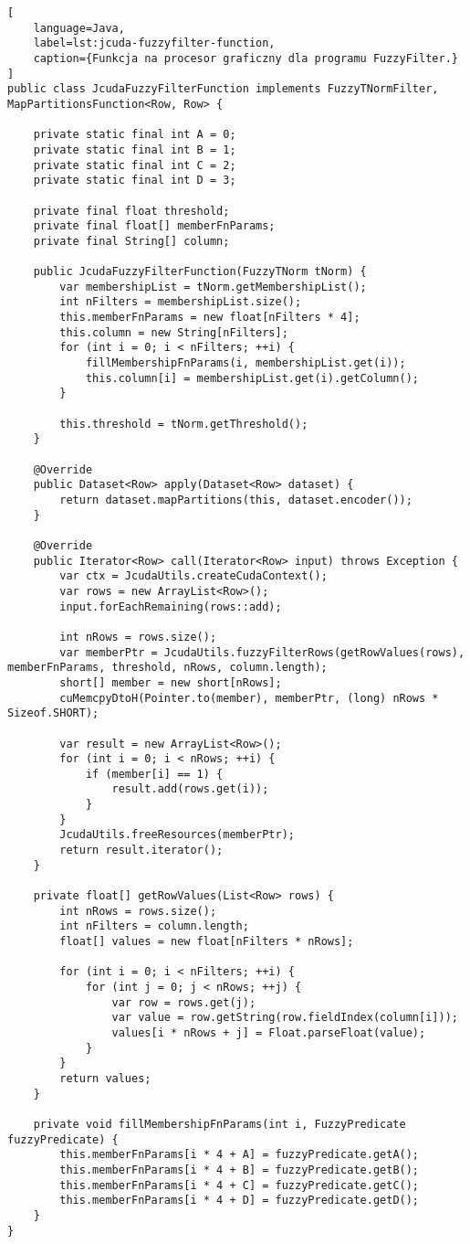 \begin{lstlisting}[
    language=Java,
    label=lst:jcuda-fuzzyfilter-function,
    caption={Funkcja na procesor graficzny dla programu FuzzyFilter.}
]
public class JcudaFuzzyFilterFunction implements FuzzyTNormFilter, MapPartitionsFunction<Row, Row> {

    private static final int A = 0;
    private static final int B = 1;
    private static final int C = 2;
    private static final int D = 3;

    private final float threshold;
    private final float[] memberFnParams;
    private final String[] column;

    public JcudaFuzzyFilterFunction(FuzzyTNorm tNorm) {
        var membershipList = tNorm.getMembershipList();
        int nFilters = membershipList.size();
        this.memberFnParams = new float[nFilters * 4];
        this.column = new String[nFilters];
        for (int i = 0; i < nFilters; ++i) {
            fillMembershipFnParams(i, membershipList.get(i));
            this.column[i] = membershipList.get(i).getColumn();
        }

        this.threshold = tNorm.getThreshold();
    }

    @Override
    public Dataset<Row> apply(Dataset<Row> dataset) {
        return dataset.mapPartitions(this, dataset.encoder());
    }

    @Override
    public Iterator<Row> call(Iterator<Row> input) throws Exception {
        var ctx = JcudaUtils.createCudaContext();
        var rows = new ArrayList<Row>();
        input.forEachRemaining(rows::add);

        int nRows = rows.size();
        var memberPtr = JcudaUtils.fuzzyFilterRows(getRowValues(rows), memberFnParams, threshold, nRows, column.length);
        short[] member = new short[nRows];
        cuMemcpyDtoH(Pointer.to(member), memberPtr, (long) nRows * Sizeof.SHORT);

        var result = new ArrayList<Row>();
        for (int i = 0; i < nRows; ++i) {
            if (member[i] == 1) {
                result.add(rows.get(i));
            }
        }
        JcudaUtils.freeResources(memberPtr);
        return result.iterator();
    }

    private float[] getRowValues(List<Row> rows) {
        int nRows = rows.size();
        int nFilters = column.length;
        float[] values = new float[nFilters * nRows];

        for (int i = 0; i < nFilters; ++i) {
            for (int j = 0; j < nRows; ++j) {
                var row = rows.get(j);
                var value = row.getString(row.fieldIndex(column[i]));
                values[i * nRows + j] = Float.parseFloat(value);
            }
        }
        return values;
    }

    private void fillMembershipFnParams(int i, FuzzyPredicate fuzzyPredicate) {
        this.memberFnParams[i * 4 + A] = fuzzyPredicate.getA();
        this.memberFnParams[i * 4 + B] = fuzzyPredicate.getB();
        this.memberFnParams[i * 4 + C] = fuzzyPredicate.getC();
        this.memberFnParams[i * 4 + D] = fuzzyPredicate.getD();
    }
}
\end{lstlisting}
\newpage
